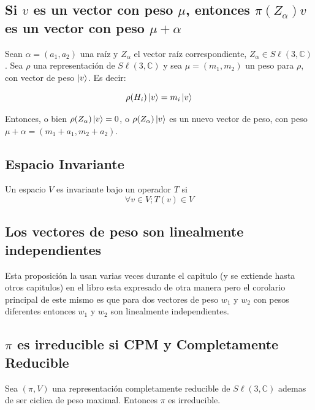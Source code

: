 \documentclass[12pt]{exam}
\begin{document}
\subsection{Si $v$ es un vector con peso $\mu$, entonces $\pi(Z_\alpha)v$ es un vector con peso $\mu + \alpha$}\label{sec:prop_6_5}

Sean $\alpha = (a_1, a_2)$ una raíz y $Z_\alpha$ el vector raíz correspondiente, $Z_\alpha \in S\ell (3, \mathbb{C})$. Sea $\rho$ una representación de $S\ell (3, \mathbb{C})$ y sea $\mu = (m_1, m_2)$ un peso para $\rho$, con vector de peso $\ket{v}$. Es decir:

\begin{equation}
  \rho (H_i) \ket{v} = m_i \ket{v}
  \label{eq:eq_peso}
\end{equation}

Entonces, o bien $\rho (Z_\alpha) \ket{v} = 0$, o $\rho (Z_\alpha) \ket{v}$ es un nuevo vector de peso, con peso $\mu + \alpha = (m_1 + a_1, m_2 + a_2)$.

\subsection{Espacio Invariante}\label{sec:espacio_invariante}

Un espacio $V$ es invariante bajo un operador $T$ si
\begin{equation}
  \forall v \in V; T(v) \in V
  \label{eq:invariante}
\end{equation}

\subsection{Los vectores de peso son linealmente independientes} \label{sec:prop_a_17}

Esta proposición la usan varias veces durante el capitulo (y se extiende hasta otros capitulos) en el libro esta expresado de otra manera pero el corolario principal de este mismo es que para dos vectores de peso $w_1$ y $w_2$ con pesos diferentes entonces $w_1$ y $w_2$ son linealmente independientes.

\subsection{$\pi$ es irreducible si CPM y Completamente Reducible}\label{sec:prop_6_14}

Sea $(\pi, V)$ una representación completamente reducible de $S\ell(3, \mathbb{C})$ ademas de ser ciclica de peso maximal. Entonces $\pi$ es irreducible.
\end{document}
